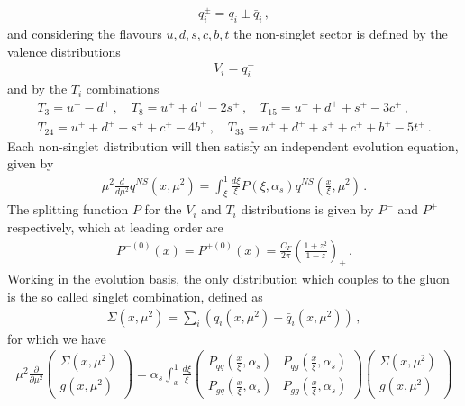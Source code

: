 \begin{align}
    q^{\pm}_i = q_i \pm \bar{q}_i\,,
\end{align}
and considering the flavours $u, d, s, c, b, t$ the non-singlet sector is defined by the valence distributions
\begin{align}
    V_i = q_i^-
\end{align} 
and by the $T_i$ combinations
\begin{align}
    T_3 = u^+ - d^+\,,\,\,\,\,\,\,T_8 = u^+ + d^+ -2s^+\,,\,\,\,\,\,\,T_{15} = u^+ + d^+ + s^+ -3c^+\,,\,\,\,\,\,\, \\
    T_{24} = u^+ + d^+ + s^+ + c^+ -4b^+\,,\,\,\,\,\,\, T_{35} = u^+ + d^+ + s^+ + c^+ + b^+ - 5 t^+\,. 
\end{align}
Each non-singlet distribution will then satisfy an independent evolution equation, given by 
\begin{align}
    \label{eq:DGLAP_NS}
    \mu^2\frac{d}{d\mu^2}q^{NS}\left(x,\mu^2\right) 
    = \int_{\xi}^1\frac{d\xi}{\xi}P\left(\xi,\alpha_s\right)
    q^{NS}\left(\frac{x}{\xi},\mu^2\right)\,.
\end{align}
The splitting function $P$ for the $V_i$ and $T_i$ distributions is given by $P^-$ and $P^+$ respectively,
which at leading order are
\begin{align}
    P^{-(0)}\left(x\right) = P^{+(0)}\left(x\right) = \frac{C_F}{2\pi}\left(\frac{1+z^2}{1-z}\right)_+ \,.
\end{align}
Working in the evolution basis, the only distribution which couples to the gluon is the so called
singlet combination, defined as
\begin{align}
    \Sigma\left(x,\mu^2\right) = \sum_i \left(q_i\left(x,\mu^2\right)+\bar{q}_i\left(x,\mu^2\right)\right)\,,
\end{align}
for which we have
\begin{align}
    \mu^2\frac{\partial}{\partial\mu^2}
    \begin{pmatrix}
        \Sigma\left(x,\mu^2\right) \\  
        g\left(x,\mu^2\right)
    \end{pmatrix}
    =
    \alpha_s\int_x^1 \frac{d\xi}{\xi} 
    \begin{pmatrix}
        P_{q q}\left(\frac{x}{\xi},\alpha_s\right) & P_{q g}\left(\frac{x}{\xi},\alpha_s\right) \\
        P_{g q}\left(\frac{x}{\xi},\alpha_s\right)   & P_{g g}\left(\frac{x}{\xi},\alpha_s\right) 
    \end{pmatrix}
    \begin{pmatrix}
        \Sigma\left(x,\mu^2\right) \\  
        g\left(x,\mu^2\right)
    \end{pmatrix}
\end{align}
